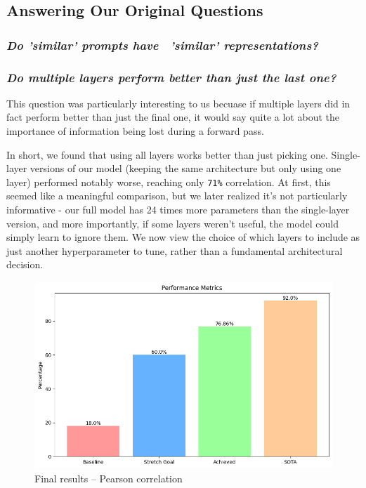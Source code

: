 \documentclass{article}
\begin{document}
\subsection{Answering Our Original Questions}
\subsubsection*{\textit{Do 'similar' prompts have \ 'similar' representations?}}

\subsubsection*{\textit{Do multiple layers perform better than just the last one?}}
This question was particularly interesting to us becuase if multiple layers did in fact perform better than just the final one, it would say quite a lot about the importance of information being lost during a forward pass.

In short, we found that using all layers works better than just picking one. Single-layer versions of our model (keeping the same architecture but only using one layer) performed notably worse, reaching only \verb|71%| correlation. At first, this seemed like a meaningful comparison, but we later realized it's not particularly informative - our full model has 24 times more parameters than the single-layer version, and more importantly, if some layers weren't useful, the model could simply learn to ignore them. We now view the choice of which layers to include as just another hyperparameter to tune, rather than a fundamental architectural decision.

\begin{figure}
    \centering
    \includegraphics[width=.85\linewidth]{final_results.png}
    \caption{Final results -- Pearson correlation}
    \label{fig:final-reslts}
\end{figure}
\end{document}
